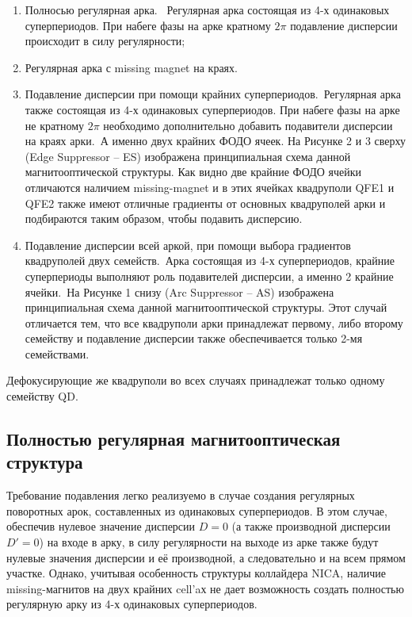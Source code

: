 \begin{enumerate} 
\item	Полносью регулярная арка. \ Регулярная арка состоящая из 4-х одинаковых суперпериодов. При набеге фазы на арке кратному $2\pi$ подавление дисперсии происходит в силу регулярности;
\item Регулярная арка с missing magnet на краях.
\item	Подавление дисперсии при помощи крайних суперпериодов.\
Регулярная арка также состоящая из 4-х одинаковых суперпериодов. При набеге фазы на арке не кратному $2\pi$ необходимо дополнительно добавить подавители дисперсии на краях арки.\
А именно двух крайних ФОДО ячеек. На Рисунке 2 и 3 сверху (Edge Suppressor – ES) изображена принципиальная схема данной магнитооптической структуры. Как видно две крайние ФОДО ячейки отличаются наличием missing-magnet и в этих ячейках квадруполи QFE1 и QFE2 также имеют отличные градиенты от основных квадруполей арки и подбираются таким образом, чтобы подавить дисперсию.
\item	Подавление дисперсии всей аркой, при помощи выбора градиентов квадруполей двух семейств.\
Арка состоящая из 4-х суперпериодов, крайние суперпериоды выполняют роль подавителей дисперсии, а именно 2 крайние ячейки.\
На Рисунке 1 снизу (Arc Suppressor – AS) изображена принципиальная схема данной магнитооптической структуры. Этот случай отличается тем, что все квадруполи арки принадлежат первому, либо второму семейству и подавление дисперсии также обеспечивается только 2-мя семействами.
\end{enumerate} 

\noindent Дефокусирующие же квадруполи во всех случаях принадлежат только одному семейству QD.	

\subsection{Полностью регулярная магнитооптическая структура}\label{subsec:transition_variation/disp_supperssion/regular}

\par Требование подавления легко реализуемо в случае создания регулярных поворотных арок, составленных из одинаковых суперпериодов. В этом случае, обеспечив нулевое значение дисперсии $D=0$ (а также производной дисперсии $D\prime=0$) на входе в арку, в силу регулярности на выходе из арке также будут нулевые значения дисперсии и её производной, а следовательно и на всем прямом участке. Однако, учитывая особенность структуры коллайдера NICA, наличие missing-магнитов на двух крайних cell’aх не дает возможность создать полностью регулярную арку из 4-х одинаковых суперпериодов.

